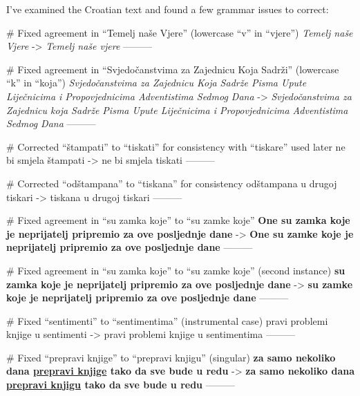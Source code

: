 I've examined the Croatian text and found a few grammar issues to correct:

# Fixed agreement in “Temelj naše Vjere” (lowercase “v” in “vjere”)
\textit{Temelj naše Vjere}
->
\textit{Temelj naše vjere}
---------

# Fixed agreement in “Svjedočanstvima za Zajednicu Koja Sadrži” (lowercase “k” in “koja”)
\textit{Svjedočanstvima za Zajednicu Koja Sadrže Pisma Upute Liječnicima i Propovjednicima Adventistima Sedmog Dana}
->
\textit{Svjedočanstvima za Zajednicu koja Sadrže Pisma Upute Liječnicima i Propovjednicima Adventistima Sedmog Dana}
---------

# Corrected “štampati” to “tiskati” for consistency with “tiskare” used later
ne bi smjela štampati
->
ne bi smjela tiskati
---------

# Corrected “odštampana” to “tiskana” for consistency
odštampana u drugoj tiskari
->
tiskana u drugoj tiskari
---------

# Fixed agreement in “su zamka koje” to “su zamke koje”
\textbf{One su zamka koje je neprijatelj pripremio za ove posljednje dane}
->
\textbf{One su zamke koje je neprijatelj pripremio za ove posljednje dane}
---------

# Fixed agreement in “su zamka koje” to “su zamke koje” (second instance)
\textbf{su zamka koje je neprijatelj pripremio za ove posljednje dane}
->
\textbf{su zamke koje je neprijatelj pripremio za ove posljednje dane}
---------

# Fixed “sentimenti” to “sentimentima” (instrumental case)
pravi problemi knjige u sentimenti
->
pravi problemi knjige u sentimentima
---------

# Fixed “prepravi knjige” to “prepravi knjigu” (singular)
\textbf{za samo nekoliko dana \underline{prepravi knjige} tako da sve bude u redu}
->
\textbf{za samo nekoliko dana \underline{prepravi knjigu} tako da sve bude u redu}
---------